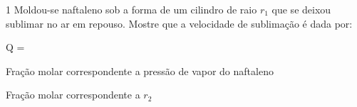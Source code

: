 \documentclass[\mainfilename]{subfiles}
\begin{document}
\begin{questionBox}1{ %
    Moldou-se naftaleno sob a forma de um cilindro de raio \(r_1\) que se deixou sublimar no ar em repouso. Mostre que a velocidade de sublimação é dada por:
} %
    \begin{BM}
        Q
        =
        \,
    \end{BM}

    \begin{description}[
        leftmargin=!,
        labelwidth=\widthof{} %
    ]
        \item[\(y_{A,*}\)] Fração molar correspondente a pressão de vapor do naftaleno
        \item[\(y_{A,2}\)] Fração molar correspondente a \(r_2\)
    \end{description}



\end{questionBox}
\end{document}
